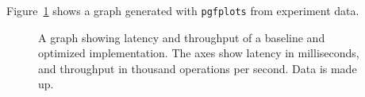 Figure~\ref{fig:graph} shows a graph generated with \texttt{pgfplots} from 
experiment data.
\begin{figure}
\caption{A graph showing latency and throughput of a baseline and optimized implementation. The axes show latency in milliseconds, and throughput in thousand operations per second. Data is made up.}
\label{fig:graph}
\end{figure}
